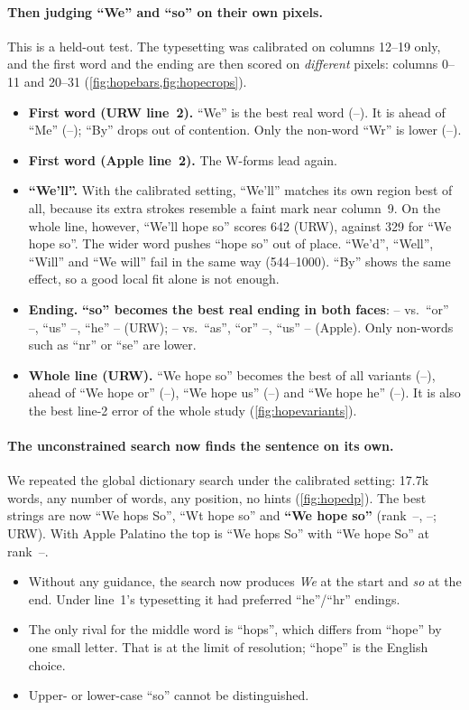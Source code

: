 \documentclass[10pt,a4paper]{article}
\providecommand{\HopeUFWe}{--}\providecommand{\HopeUFMe}{--}\providecommand{\HopeUFWr}{--}\providecommand{\HopeUESo}{--}\providecommand{\HopeUEOr}{--}
\providecommand{\HopeUEUs}{--}\providecommand{\HopeUEHe}{--}\providecommand{\HopeAESo}{--}\providecommand{\HopeAEOr}{--}\providecommand{\HopeAEUs}{--}
\providecommand{\HopeUVWeHopeSo}{--}\providecommand{\HopeUVWeHopeOr}{--}\providecommand{\HopeUVWeHopeUs}{--}\providecommand{\HopeUVWeHopeHe}{--}
\providecommand{\HopeDPURankLc}{--}\providecommand{\HopeDPUSseLc}{--}\providecommand{\HopeDPARankUc}{--}
\newcommand{\q}[1]{``#1''}
\begin{document}
\paragraph{Then judging \q{We} and \q{so} on their own pixels.}
This is a held-out test. The typesetting was calibrated on columns 12--19 only, and the first word and the ending are
then scored on \emph{different} pixels: columns 0--11 and 20--31 (\cref{fig:hopebars,fig:hopecrops}).
\begin{itemize}
\item \textbf{First word (URW line~2).} \q{We} is the best real word (\HopeUFWe). It is ahead of \q{Me} (\HopeUFMe);
\q{By} drops out of contention. Only the non-word \q{Wr} is lower (\HopeUFWr).
\item \textbf{First word (Apple line~2).} The W-forms lead again.
\item \textbf{\q{We'll}.} With the calibrated setting, \q{We'll} matches its own region best of all, because its extra
strokes resemble a faint mark near column~9. On the whole line, however, \q{We'll hope so} scores 642 (URW), against 329
for \q{We hope so}. The wider word pushes \q{hope so} out of place. \q{We'd}, \q{Well}, \q{Will} and \q{We will} fail
in the same way (544--1000). \q{By} shows the same effect, so a good local fit alone is not enough.
\item \textbf{Ending.} \textbf{\q{so} becomes the best real ending in both faces}: \HopeUESo{} vs.\ \q{or} \HopeUEOr,
\q{us} \HopeUEUs, \q{he} \HopeUEHe{} (URW); \HopeAESo{} vs.\ \q{as}, \q{or} \HopeAEOr, \q{us} \HopeAEUs{} (Apple).
Only non-words such as \q{nr} or \q{se} are lower.
\item \textbf{Whole line (URW).} \q{We hope so} becomes the best of all variants (\HopeUVWeHopeSo), ahead of
\q{We hope or} (\HopeUVWeHopeOr), \q{We hope us} (\HopeUVWeHopeUs) and \q{We hope he} (\HopeUVWeHopeHe). It is also the
best line-2 error of the whole study (\cref{fig:hopevariants}).
\end{itemize}

\paragraph{The unconstrained search now finds the sentence on its own.}
We repeated the global dictionary search under the calibrated setting: 17.7k words, any number of words, any position,
no hints (\cref{fig:hopedp}). The best strings are now \q{We hops So}, \q{Wt hope so} and \textbf{\q{We hope so}}
(rank~\HopeDPURankLc, \HopeDPUSseLc; URW). With Apple Palatino the top is \q{We hops So} with \q{We hope So} at
rank~\HopeDPARankUc.
\begin{itemize}
\item Without any guidance, the search now produces \emph{We} at the start and \emph{so} at the end. Under line~1's
typesetting it had preferred \q{he}/\q{hr} endings.
\item The only rival for the middle word is \q{hops}, which differs from \q{hope} by one small letter. That is at the
limit of resolution; \q{hope} is the English choice.
\item Upper- or lower-case \q{so} cannot be distinguished.
\end{itemize}
\end{document}
